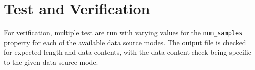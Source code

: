 \documentclass{article}
\begin{document}
\section*{Test and Verification}
\begin{flushleft}
\justify
For verification, multiple test are run with varying values for the \verb+num_samples+ property for each of the available data source modes. The output file is checked for expected length and data contents, with the data content check being specific to the given data source mode.
\end{flushleft}
\end{document}
